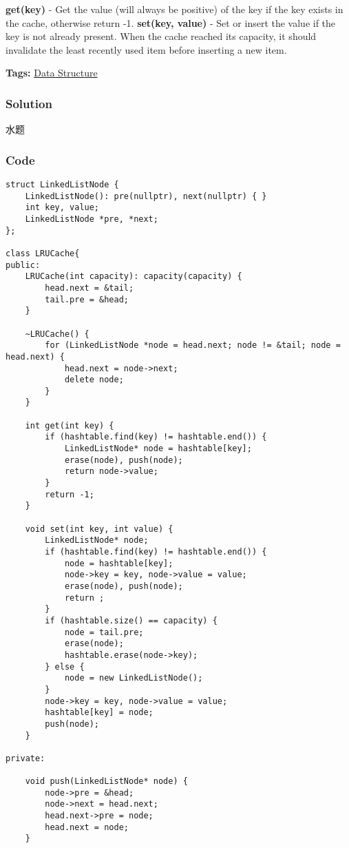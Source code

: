 \documentclass{article}
\begin{document}
\begin{CJK*}{UTF8}{gkai}
\textbf{get(key)} - Get the value (will always be positive) of the key if the key exists in the cache, otherwise return -1.
\textbf{set(key, value)} - Set or insert the value if the key is not already present. When the cache reached its capacity, it should invalidate the least recently used item before inserting a new item.


\textbf{Tags: }
\hyperref[ Data Structure ]{ Data Structure }



\subsubsection*{Solution}
水题

\subsubsection*{Code}
\begin{lstlisting}
struct LinkedListNode {
    LinkedListNode(): pre(nullptr), next(nullptr) { }
    int key, value;
    LinkedListNode *pre, *next;
};

class LRUCache{
public:
    LRUCache(int capacity): capacity(capacity) {
        head.next = &tail;
        tail.pre = &head;
    }

    ~LRUCache() {
    	for (LinkedListNode *node = head.next; node != &tail; node = head.next) {
    		head.next = node->next;
    		delete node;
    	}
    }

    int get(int key) {
        if (hashtable.find(key) != hashtable.end()) {
            LinkedListNode* node = hashtable[key];
            erase(node), push(node);
            return node->value;
        }
        return -1;
    }
    
    void set(int key, int value) {
        LinkedListNode* node;
        if (hashtable.find(key) != hashtable.end()) {
            node = hashtable[key];
            node->key = key, node->value = value;
            erase(node), push(node);
            return ;
        }
        if (hashtable.size() == capacity) {
            node = tail.pre;
            erase(node);
            hashtable.erase(node->key);
        } else {
            node = new LinkedListNode();
        }
        node->key = key, node->value = value;
        hashtable[key] = node;
        push(node);
    }
    
private:
    
    void push(LinkedListNode* node) {
        node->pre = &head;
        node->next = head.next;
        head.next->pre = node;
        head.next = node;
    }
    

\end{lstlisting}
\end{CJK*}
\end{document}
